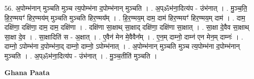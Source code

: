 \documentclass[17pt]{extarticle}
\begin{document}
56. अ॒पोम्भ॑नान् मुञ्चति मुञ्च त्य॒पोम्भ॑ना द॒पोम्भ॑नान् मुञ्चति । . अ॒प्ॐभ॑ना॒दित्य॑प - उंभ॑नात् । . मु॒ञ्च॒ति॒ हि॒र॒ण्मयꣳ॑ हिर॒ण्मय॑म् मुञ्चति मुञ्चति हिर॒ण्मय᳚म् । . हि॒र॒ण्मय॒म् दाम॒ दाम॑ हिर॒ण्मयꣳ॑ हिर॒ण्मय॒म् दाम॑ । . दाम॒ दक्षि॑णा॒ दक्षि॑णा॒ दाम॒ दाम॒ दक्षि॑णा । . दक्षि॑णा सा॒क्षाथ् सा॒क्षाद् दक्षि॑णा॒ दक्षि॑णा सा॒क्षात् । . सा॒क्षा दे॒वैव सा॒क्षाथ् सा॒क्षा दे॒व । . सा॒क्षादिति॑ स - अ॒क्षात् । . ए॒वैन॑ मेन मे॒वैवैन᳚म् । . ए॒न॒म् दाम्नो॒ दाम्न॑ एन मेन॒म् दाम्नः॑ । . दाम्नो॒ ऽपोम्भ॑ना द॒पोम्भ॑ना॒द् दाम्नो॒ दाम्नो॒ ऽपोम्भ॑नात् । . अ॒पोम्भ॑नान् मुञ्चति मुञ्च त्य॒पोम्भ॑ना द॒पोम्भ॑नान् मुञ्चति । . अ॒प्ॐभ॑ना॒दित्य॑प - उंभ॑नात् । . मु॒ञ्च॒तीति॑ मुञ्चति । \newline

\textbf{Ghana Paata } \newline
\end{document}
